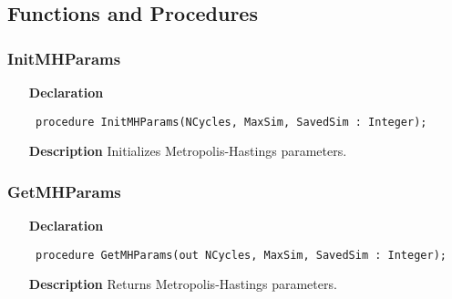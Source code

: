 \documentclass[12pt,a4paper,oneside]{report}
\newcommand{\declarationitem}[1]{\textbf{#1}}
\newcommand{\descriptiontitle}[1]{\textbf{#1}}
\newcommand{\code}[1]{\texttt{#1}}
\begin{document}
\subsection{Functions and Procedures}
\subsubsection{InitMHParams}
\label{umcmc-InitMHParams}
\begin{itemize}\item[\declarationitem{Declaration}\hfill]
	\begin{flushleft}
		\code{
			procedure InitMHParams(NCycles, MaxSim, SavedSim : Integer);}
		
	\end{flushleft}
	
	\par
	\item[\descriptiontitle{Description}]
	Initializes Metropolis{-}Hastings parameters.
	
\end{itemize}
\subsubsection{GetMHParams}
\label{umcmc-GetMHParams}
\begin{itemize}\item[\declarationitem{Declaration}\hfill]
	\begin{flushleft}
		\code{
			procedure GetMHParams(out NCycles, MaxSim, SavedSim : Integer);}
		
	\end{flushleft}
	
	\par
	\item[\descriptiontitle{Description}]
	Returns Metropolis{-}Hastings parameters.
	
\end{itemize}
\end{document}
